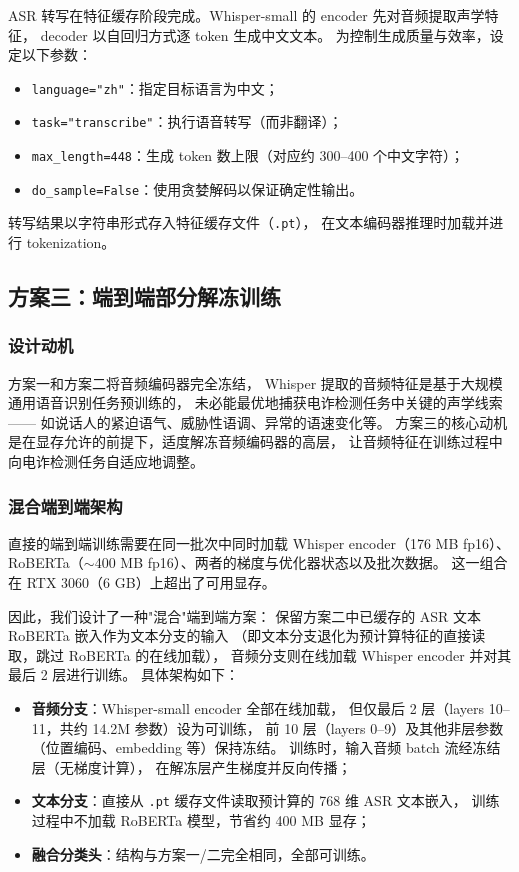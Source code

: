 \documentclass[11pt,a4paper]{ctexart}
\begin{document}
ASR 转写在特征缓存阶段完成。Whisper-small 的 encoder 先对音频提取声学特征，
decoder 以自回归方式逐 token 生成中文文本。
为控制生成质量与效率，设定以下参数：

\begin{itemize}
  \item \texttt{language="zh"}：指定目标语言为中文；
  \item \texttt{task="transcribe"}：执行语音转写（而非翻译）；
  \item \texttt{max\_length=448}：生成 token 数上限（对应约 300--400 个中文字符）；
  \item \texttt{do\_sample=False}：使用贪婪解码以保证确定性输出。
\end{itemize}

转写结果以字符串形式存入特征缓存文件（\texttt{.pt}），
在文本编码器推理时加载并进行 tokenization。

\subsection{方案三：端到端部分解冻训练}

\subsubsection{设计动机}

方案一和方案二将音频编码器完全冻结，
Whisper 提取的音频特征是基于大规模通用语音识别任务预训练的，
未必能最优地捕获电诈检测任务中关键的声学线索——
如说话人的紧迫语气、威胁性语调、异常的语速变化等。
方案三的核心动机是在显存允许的前提下，适度解冻音频编码器的高层，
让音频特征在训练过程中向电诈检测任务自适应地调整。

\subsubsection{混合端到端架构}

直接的端到端训练需要在同一批次中同时加载 Whisper encoder（176 MB fp16）、
RoBERTa（$\sim$400 MB fp16）、两者的梯度与优化器状态以及批次数据。
这一组合在 RTX 3060（6 GB）上超出了可用显存。

因此，我们设计了一种"混合"端到端方案：
保留方案二中已缓存的 ASR 文本 RoBERTa 嵌入作为文本分支的输入
（即文本分支退化为预计算特征的直接读取，跳过 RoBERTa 的在线加载），
音频分支则在线加载 Whisper encoder 并对其最后 2 层进行训练。
具体架构如下：

\begin{itemize}
  \item \textbf{音频分支}：Whisper-small encoder 全部在线加载，
  但仅最后 2 层（layers 10--11，共约 14.2M 参数）设为可训练，
  前 10 层（layers 0--9）及其他非层参数（位置编码、embedding 等）保持冻结。
  训练时，输入音频 batch 流经冻结层（无梯度计算），
  在解冻层产生梯度并反向传播；
  \item \textbf{文本分支}：直接从 \texttt{.pt} 缓存文件读取预计算的 768 维 ASR 文本嵌入，
  训练过程中不加载 RoBERTa 模型，节省约 400 MB 显存；
  \item \textbf{融合分类头}：结构与方案一/二完全相同，全部可训练。
\end{itemize}
\end{document}

